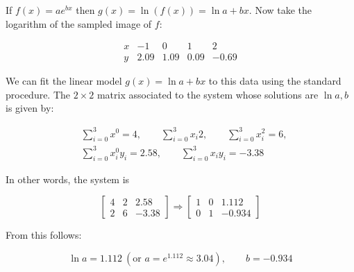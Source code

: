 \documentclass[12pt]{article}
\theoremstyle{definition}
\begin{document}
If $f(x) = ae^{bx}$ then $g(x) = \ln \left( f(x) \right) = \ln a + bx$.
Now take the logarithm of the sampled image of $f$:


     \begin{equation*}
    \begin{array}{c|c|c|c|c}
        x & -1 & 0 & 1 & 2\\ 
        y & 2.09 & 1.09 & 0.09 & -0.69 
     \end{array}
     \end{equation*}

We can fit the linear model $g(x) = \ln a + bx$ to this data using the standard
procedure. The $2\times 2$ matrix associated to the system whose solutions are
$\ln a, b$ is given by: 

\begin{align*}
    &\sum_{i=0}^3 x^0 = 4, \qquad \sum_{i=0}^3 x_i 2, \qquad \sum_{i=0}^3 x_i^2
    = 6, \\ 
    &\sum_{i=0}^3 x_i^0 y_i = 2.58, \qquad \sum_{i=0}^3 x_i y_i = -3.38
\end{align*}

In other words, the system is 

\begin{equation*}
    \begin{bmatrix} 
        4 & 2 &2.58 \\ 
        2 & 6  & -3.38
        \end{bmatrix} \Rightarrow \begin{bmatrix} 
        1 & 0 & 1.112 \\ 
        0 & 1 & -0.934
    \end{bmatrix}   
\end{equation*}

From this follows: 

\begin{equation*}
    \ln a = 1.112 ~ (\text{or } a = e^{1.112} \approx 3.04), \qquad b = -0.934
\end{equation*}

\end{document}
